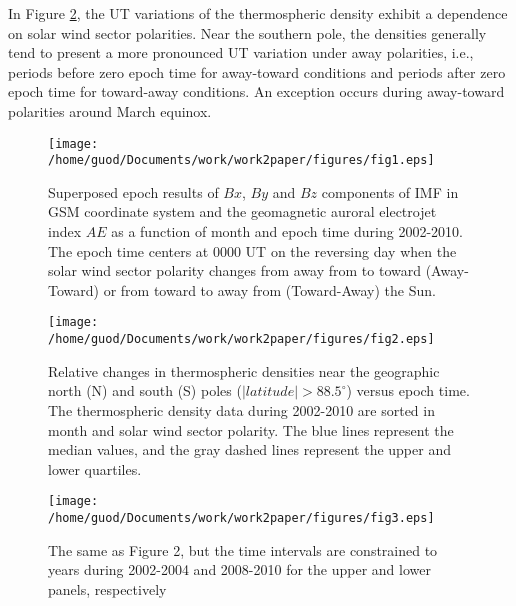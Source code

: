 \documentclass[draft, grl]{/home/guod/Documents/template/agu_template/AGUTeX}
\begin{document}
\begin{article}
    In Figure \ref{figure2}, the UT variations of the thermospheric density exhibit a dependence 
    on solar wind sector polarities. 
    Near the southern pole, the densities generally tend to present a more pronounced UT variation 
    under away polarities, i.e., periods before zero epoch time for away-toward conditions and periods 
    after zero epoch time for toward-away conditions.
    An exception occurs during away-toward polarities around March equinox.
    


\end{article}
\begin{figure}
    \centering
    \noindent\texttt{[image: /home/guod/Documents/work/work2paper/figures/fig1.eps]}
    \caption{Superposed epoch results of $Bx$, $By$ and $Bz$ components of IMF in GSM coordinate system and the
    geomagnetic auroral electrojet index $AE$ as a function of month and epoch time during 2002-2010. The epoch 
    time centers at 0000 UT on the reversing day when the solar wind sector polarity changes from away from to 
    toward (Away-Toward) or from toward to away from (Toward-Away) the Sun. }
    \label{figure1}
\end{figure}
\begin{figure}
    \centering
    \noindent\texttt{[image: /home/guod/Documents/work/work2paper/figures/fig2.eps]}
    \caption{Relative changes in thermospheric densities near the geographic north (N) and south (S) poles 
    ($\left|latitude\right| > 88.5^\circ$) versus epoch time. The thermospheric density data during 2002-2010 
    are sorted in month and solar wind sector polarity. The blue lines represent the median values, and the 
    gray dashed lines represent the upper and lower quartiles.}
    \label{figure2}
\end{figure}
\begin{figure}
    \centering
    \noindent\texttt{[image: /home/guod/Documents/work/work2paper/figures/fig3.eps]}
    \caption{The same as Figure 2, but the time intervals are constrained to years during 2002-2004 
    and 2008-2010 for the upper and lower panels, respectively}
    \label{figure3}
\end{figure}
\end{document}
